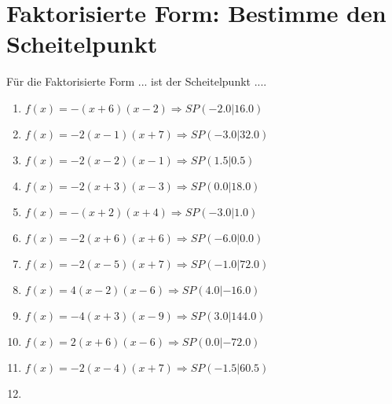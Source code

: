 \documentclass{article}%
\begin{document}
\section{Faktorisierte Form: Bestimme den Scheitelpunkt}%
\label{sec:FaktorisierteFormBestimmedenScheitelpunkt}%
Für die Faktorisierte Form ... ist der Scheitelpunkt ....%
\begin{enumerate}[label=\alph*)]%
\item%
\newline\vspace{0.5cm}$f(x)=-(x+6)(x-2) \Rightarrow SP(-2.0|16.0) $%
\item%
\newline\vspace{0.5cm}$f(x)=-2(x-1)(x+7) \Rightarrow SP(-3.0|32.0) $%
\item%
\newline\vspace{0.5cm}$f(x)=-2(x-2)(x-1) \Rightarrow SP(1.5|0.5) $%
\item%
\newline\vspace{0.5cm}$f(x)=-2(x+3)(x-3) \Rightarrow SP(0.0|18.0) $%
\item%
\newline\vspace{0.5cm}$f(x)=-(x+2)(x+4) \Rightarrow SP(-3.0|1.0) $%
\item%
\newline\vspace{0.5cm}$f(x)=-2(x+6)(x+6) \Rightarrow SP(-6.0|0.0) $%
\item%
\newline\vspace{0.5cm}$f(x)=-2(x-5)(x+7) \Rightarrow SP(-1.0|72.0) $%
\item%
\newline\vspace{0.5cm}$f(x)=4(x-2)(x-6) \Rightarrow SP(4.0|-16.0) $%
\item%
\newline\vspace{0.5cm}$f(x)=-4(x+3)(x-9) \Rightarrow SP(3.0|144.0) $%
\item%
\newline\vspace{0.5cm}$f(x)=2(x+6)(x-6) \Rightarrow SP(0.0|-72.0) $%
\item%
\newline\vspace{0.5cm}$f(x)=-2(x-4)(x+7) \Rightarrow SP(-1.5|60.5) $%
\item%

\end{enumerate}
\end{document}
